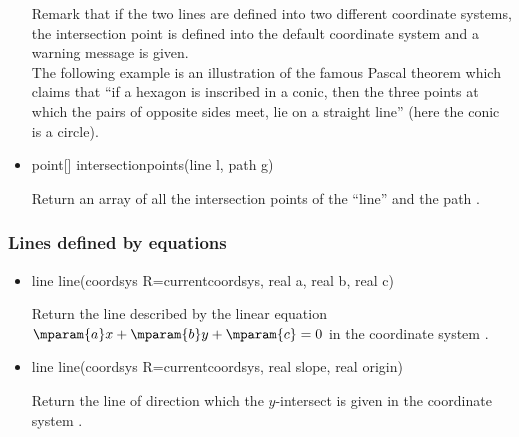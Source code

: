 \documentclass[pdftex]{article}
\begin{document}
\begin{itemize}
  Remark that if the two lines are defined into two different
  coordinate systems, the intersection point is defined into the
  default coordinate system and a warning message is given.\\
  The following example is an illustration of the famous Pascal
  theorem which claims that ``if a hexagon is inscribed in a conic,
  then the three points at which the pairs of opposite sides meet, lie
  on a straight line'' (here the conic is a circle).
\item {}%
  \begin{Vcolor}
    point[] intersectionpoints(line l, path g)
  \end{Vcolor}
  Return an array of all the intersection points of the
  ``line''  and the path .
  \end{itemize}

\subsubsection{Lines defined by equations}
\begin{itemize}
\item {}%
  \begin{Vcolor}
    line line(coordsys R=currentcoordsys, real a, real b, real c)
  \end{Vcolor}
  Return the line  described by the linear equation
  $\mparam{a}x+\mparam{b}y+\mparam{c}=0$ in the coordinate system .
  \item {}%
  \begin{Vcolor}
    line line(coordsys R=currentcoordsys, real slope, real origin)
  \end{Vcolor}
  Return the line of direction  which the $y$-intersect
  is  given in the coordinate system .
  \end{itemize}
\end{document}
